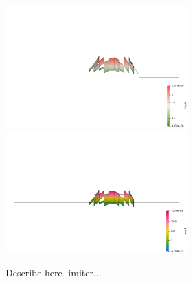\begin{center}
\includegraphics[width=7cm]{python_codes/fieldstone_41/results/exp3/rho_ls_warp2}
\includegraphics[width=7cm]{python_codes/fieldstone_41/results/exp3/eta_ls_warp2}\\
\end{center}

Describe here limiter...


